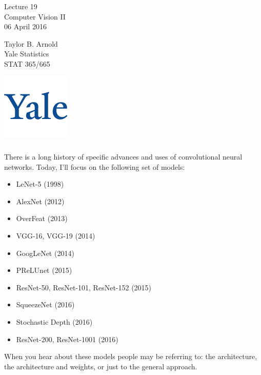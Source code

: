 \documentclass[xetex,mathserif,serif,aspectratio=169]{beamer}
\begin{document}
\begin{frame}[fragile] \frametitle{} \oldB \small

\vfill

{\fontsize{0.7cm}{0cm}\selectfont Lecture 19 \\\vspace{0.2cm}
Computer Vision II}\\\vspace{0.5cm}
06 April 2016

\vspace{2cm}

\begin{minipage}{0.6\textwidth}
Taylor B. Arnold \\
Yale Statistics \\
STAT 365/665
\end{minipage}
\hfill
\begin{minipage}{0.3\textwidth}\raggedleft
\includegraphics[scale=0.3]{../yale-logo.png}
\end{minipage}%

\end{frame}


\begin{frame}[fragile] \frametitle{} \oldB \footnotesize


There is a long history of specific advances and uses of convolutional
neural networks. Today, I'll focus on the following set of models: \vspace*{-0.5cm}
\begin{itemize}
\item LeNet-5 (1998)
\item AlexNet (2012)
\item OverFeat (2013)
\item VGG-16, VGG-19 (2014)
\item GoogLeNet (2014)
\item PReLUnet (2015)
\item ResNet-50, ResNet-101, ResNet-152 (2015)
\item SqueezeNet (2016)
\item Stochastic Depth (2016)
\item ResNet-200, ResNet-1001 (2016)
\end{itemize} \vspace*{-0.5cm}
When you hear about these models people may be referring to: the architecture,
the architecture and weights, or just to the general approach.

\end{frame}
\end{document}
